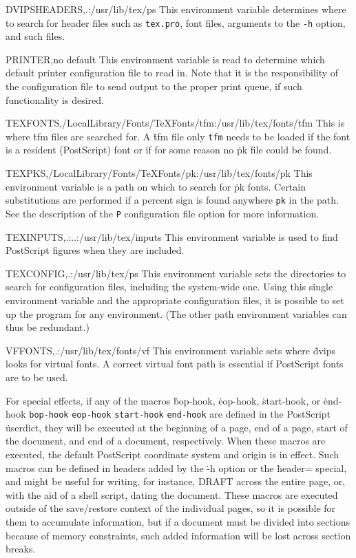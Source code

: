 \descenv DVIPSHEADERS,{.:/usr/lib/tex/ps}
  This environment variable determines where to search for header
files such as {\tt tex.pro}, font files, arguments to the
{\tt -h} option, and such files.

\descenv PRINTER,{\rm no default}
  This environment variable is read to determine which default printer
configuration file to read in.	Note that it is the responsibility of
the configuration file to send output to the proper print queue, if such
functionality is desired.

\descenv TEXFONTS,{/LocalLibrary/Fonts/TeXFonts/tfm:/usr/lib/tex/fonts/tfm}
  This is where \.{tfm} files are searched for.  A \.{tfm} file only
\^{{\tt tfm}}
needs to be loaded if the font is a resident (PostScript) font or if
for some reason no \.{pk} file could be found.

\descenv TEXPKS,{/LocalLibrary/Fonts/TeXFonts/pk:/usr/lib/tex/fonts/pk}
This environment variable is a path on which to search for \.{pk} fonts.
Certain substitutions are performed if a percent sign is found anywhere
\^{{\tt pk}}
in the path.  See the description of the {\tt P} configuration file
option for more information.

\descenv TEXINPUTS,{.:..:/usr/lib/tex/inputs}
  This environment variable is used to find PostScript figures when they
are included.

\descenv TEXCONFIG,{.:/usr/lib/tex/ps}
  This environment variable sets the directories to search for configuration
files, including the system-wide one.  Using this single environment variable
and the appropriate configuration files, it is possible to set up the program
for any environment.  (The other path environment variables can thus be
redundant.)

\descenv VFFONTS,{.:/usr/lib/tex/fonts/vf}
  This environment variable sets where \.{dvips} looks for virtual fonts.
A correct virtual font path is essential if PostScript fonts are to be
used.


For special effects, if any of the macros
\.{bop-hook}, \.{eop-hook}, \.{start-hook}, or \.{end-hook}
\^{{\tt bop-hook}}
\^{{\tt eop-hook}}
\^{{\tt start-hook}}
\^{{\tt end-hook}}
are defined in the PostScript \.{userdict}, they will be executed at the
beginning of a page, end of a page, start of the document, and end of
a document, respectively.
When these macros are executed, the default PostScript coordinate system
and origin
is in effect.  Such macros can be defined in headers added by the
\.{-h} option or the \.{header=}
special, and might be useful for writing, for instance, DRAFT across the
entire page, or, with the aid of a shell script, dating the document.
These macros are executed outside of the save/restore context of the
individual pages, so it is possible for them to accumulate information,
but if a document must be divided into sections because of memory
constraints, such added information will be lost across section breaks.

